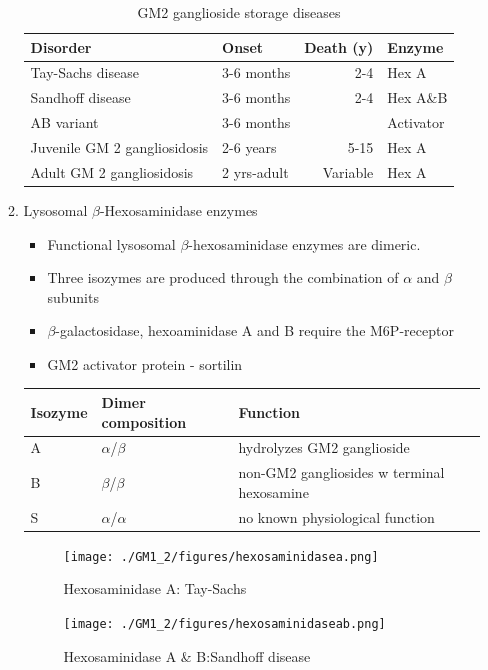 \documentclass{scrartcl}
\begin{document}
\begin{enumerate}
\begin{enumerate}
\begin{table}[htbp]
\caption{\label{tab:org65e245d}
GM2 ganglioside storage diseases}
\centering
\begin{tabular}{llrl}
Disorder & Onset & Death (y) & Enzyme\\
\hline
Tay-Sachs disease & 3-6 months & 2-4 & Hex A\\
Sandhoff disease & 3-6 months & 2-4 & Hex A\&B\\
AB variant & 3-6 months &  & Activator\\
Juvenile GM 2 gangliosidosis & 2-6 years & 5-15 & Hex A\\
Adult GM 2 gangliosidosis & 2 yrs-adult & Variable & Hex A\\
\end{tabular}
\end{table}


\item Lysosomal \(\beta\)-Hexosaminidase enzymes
\label{sec:orgdf70402}

\begin{itemize}
\item Functional lysosomal \(\beta\)-hexosaminidase enzymes are dimeric.
\item Three isozymes are produced through the combination of \(\alpha\)
and \(\beta\) subunits
\item \(\beta\)-galactosidase, hexoaminidase A and B require the M6P-receptor
\item GM2 activator protein - sortilin
\end{itemize}

\begin{center}
\begin{tabular}{lll}
Isozyme & Dimer composition & Function\\
\hline
A & \(\alpha\)/\(\beta\) & hydrolyzes GM2 ganglioside\\
B & \(\beta\)/\(\beta\) & non-GM2 gangliosides w terminal hexosamine\\
S & \(\alpha\)/\(\alpha\) & no known physiological function\\
\end{tabular}
\end{center}

\begin{figure}[htbp]
\centering
\texttt{[image: ./GM1\_2/figures/hexosaminidasea.png]}
\caption{\label{fig:org64ab286}
Hexosaminidase A: Tay-Sachs}
\end{figure}


\begin{figure}[htbp]
\centering
\texttt{[image: ./GM1\_2/figures/hexosaminidaseab.png]}
\caption{\label{fig:orgef3fb0b}
Hexosaminidase A \& B:Sandhoff disease}
\end{figure}




\end{enumerate}
\end{enumerate}
\end{document}
